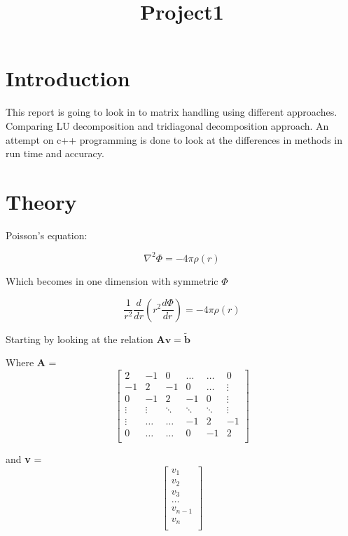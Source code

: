 \documentclass[12pt]{article}
\begin{document}
\title{Project1}


\section*{Introduction}

This report is going to look in to matrix handling using different approaches. 
Comparing LU decomposition and tridiagonal decomposition approach. An attempt on c++ programming is done to look at the differences in methods in run time and accuracy. 



\section*{Theory}


Poisson's equation: 

\begin{equation}
 \nabla^2 \Phi = -4\pi \rho(r)
\end{equation}


Which becomes in one dimension with symmetric $\Phi$ 

\begin{equation}
\frac{1}{r^2} \frac{d}{dr}(r^2\frac{d\Phi}{dr}) = -4\pi \rho(r)
\end{equation}


Starting by looking at the relation 
$\textbf{Av} = \tilde{\textbf{b}}$

Where \textbf{A} =
$$
\begin{bmatrix}
2 & -1 & 0 & \ldots & \ldots & 0 \\
-1 & 2 & -1 & 0 &\ldots & \vdots \\ 
0 & -1 & 2 & -1 & 0 & \vdots \\
\vdots & \vdots & \ddots & \ddots & \ddots & \vdots\\ 
\vdots & \ldots & \ldots & -1 & 2 & -1\\
0 & \ldots & \ldots & 0 & -1 & 2\\
\end{bmatrix}
$$

and \textbf{v} = $$\begin{bmatrix}
v_1\\
v_2\\
v_3\\
\ldots\\
v_{n-1}\\
v_{n}\\
\end{bmatrix}
$$
\end{document}
